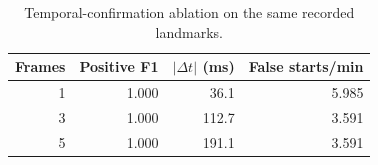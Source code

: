 \begin{table}[t]
\centering
\small
\caption{Temporal-confirmation ablation on the same recorded landmarks.}
\label{tab:pinch_ablation}
\begin{tabular}{rrrr}
\hline
Frames & Positive F1 & $|\Delta t|$ (ms) & False starts/min \\
\hline
1 & 1.000 & 36.1 & 5.985 \\
3 & 1.000 & 112.7 & 3.591 \\
5 & 1.000 & 191.1 & 3.591 \\
\hline
\end{tabular}
\end{table}

